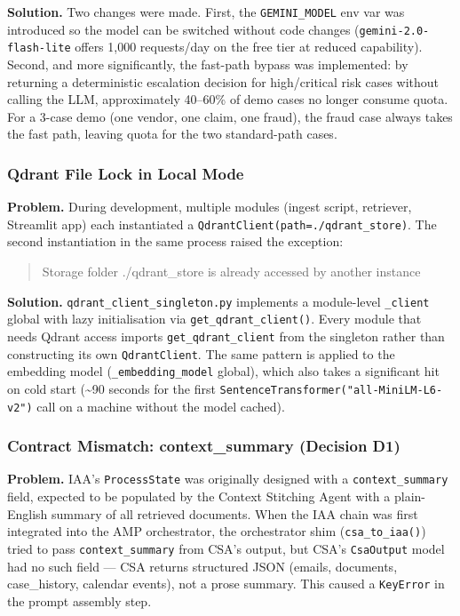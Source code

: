 \documentclass[12pt,a4paper]{article}
\begin{document}
\textbf{Solution.} Two changes were made. First, the \texttt{GEMINI\_MODEL} env var
was introduced so the model can be switched without code changes
(\texttt{gemini-2.0-flash-lite} offers 1,000 requests/day on the free tier at
reduced capability). Second, and more significantly, the fast-path bypass was
implemented: by returning a deterministic escalation decision for high/critical risk
cases without calling the LLM, approximately 40--60\% of demo cases no longer
consume quota. For a 3-case demo (one vendor, one claim, one fraud), the fraud case
always takes the fast path, leaving quota for the two standard-path cases.

\subsubsection{Qdrant File Lock in Local Mode}

\textbf{Problem.} During development, multiple modules (ingest script, retriever,
Streamlit app) each instantiated a \texttt{QdrantClient(path=./qdrant\_store)}.
The second instantiation in the same process raised the exception:
\begin{quote}\ttfamily Storage folder ./qdrant\_store is already accessed by another instance\end{quote}

\textbf{Solution.} \texttt{qdrant\_client\_singleton.py} implements a module-level
\texttt{\_client} global with lazy initialisation via \texttt{get\_qdrant\_client()}.
Every module that needs Qdrant access imports \texttt{get\_qdrant\_client} from
the singleton rather than constructing its own \texttt{QdrantClient}. The same
pattern is applied to the embedding model (\texttt{\_embedding\_model} global), which
also takes a significant hit on cold start (\textasciitilde{}90 seconds for the first
\texttt{SentenceTransformer("all-MiniLM-L6-v2")} call on a machine without the model cached).

\subsubsection{Contract Mismatch: context\_summary (Decision D1)}

\textbf{Problem.} IAA's \texttt{ProcessState} was originally designed with a
\texttt{context\_summary} field, expected to be populated by the Context Stitching
Agent with a plain-English summary of all retrieved documents. When the IAA chain
was first integrated into the AMP orchestrator, the orchestrator shim
(\texttt{csa\_to\_iaa()}) tried to pass \texttt{context\_summary} from CSA's output,
but CSA's \texttt{CsaOutput} model had no such field --- CSA returns structured JSON
(emails, documents, case\_history, calendar events), not a prose summary.
This caused a \texttt{KeyError} in the prompt assembly step.
\end{document}
